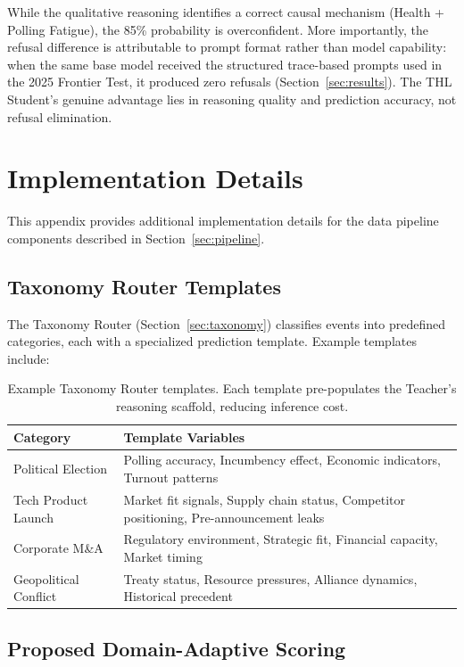 \documentclass[11pt,a4paper]{article}
\begin{document}
While the qualitative reasoning identifies a correct causal mechanism (Health + Polling Fatigue), the 85\% probability is overconfident. More importantly, the refusal difference is attributable to prompt format rather than model capability: when the same base model received the structured trace-based prompts used in the 2025 Frontier Test, it produced zero refusals (Section~\ref{sec:results}). The THL Student's genuine advantage lies in reasoning quality and prediction accuracy, not refusal elimination.

\section{Implementation Details}

This appendix provides additional implementation details for the data pipeline components described in Section~\ref{sec:pipeline}.

\subsection{Taxonomy Router Templates}

The Taxonomy Router (Section~\ref{sec:taxonomy}) classifies events into predefined categories, each with a specialized prediction template. Example templates include:

\begin{table}[h]
\centering
\begin{tabular}{lp{8cm}}
\toprule
\textbf{Category} & \textbf{Template Variables} \\
\midrule
Political Election & Polling accuracy, Incumbency effect, Economic indicators, Turnout patterns \\
Tech Product Launch & Market fit signals, Supply chain status, Competitor positioning, Pre-announcement leaks \\
Corporate M\&A & Regulatory environment, Strategic fit, Financial capacity, Market timing \\
Geopolitical Conflict & Treaty status, Resource pressures, Alliance dynamics, Historical precedent \\
\bottomrule
\end{tabular}
\caption{Example Taxonomy Router templates. Each template pre-populates the Teacher's reasoning scaffold, reducing inference cost.}
\label{tab:templates}
\end{table}

\subsection{Proposed Domain-Adaptive Scoring}
\end{document}
